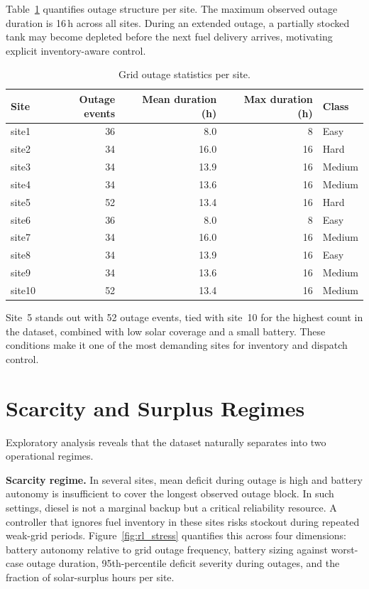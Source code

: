 Table~\ref{tab:outage_stats} quantifies outage structure per site.
The maximum observed outage duration is 16\,h across all sites.
During an extended outage, a partially stocked tank may become
depleted before the next fuel delivery arrives, motivating
explicit inventory-aware control.

\begin{table}[htb]
\centering
\small
\caption{Grid outage statistics per site.}
\label{tab:outage_stats}
\begin{tabular}{lrrrl}
\toprule
\textbf{Site} & \textbf{Outage events} & \textbf{Mean duration (h)} &
\textbf{Max duration (h)} & \textbf{Class} \\
\midrule
site1  & 36 &  8.0 &  8 & Easy   \\
site2  & 34 & 16.0 & 16 & Hard   \\
site3  & 34 & 13.9 & 16 & Medium \\
site4  & 34 & 13.6 & 16 & Medium \\
site5  & 52 & 13.4 & 16 & Hard   \\
site6  & 36 &  8.0 &  8 & Easy   \\
site7  & 34 & 16.0 & 16 & Medium \\
site8  & 34 & 13.9 & 16 & Easy   \\
site9  & 34 & 13.6 & 16 & Medium \\
site10 & 52 & 13.4 & 16 & Medium \\
\bottomrule
\end{tabular}
\end{table}

Site~5 stands out with 52 outage events, tied with site~10
for the highest count in the dataset, combined with low
solar coverage and a small battery. These conditions make
it one of the most demanding sites for inventory and
dispatch control.


\section{Scarcity and Surplus Regimes}
\label{sec:scarcity_surplus}

Exploratory analysis reveals that the dataset naturally separates into two
operational regimes.

\textbf{Scarcity regime.}
In several sites, mean deficit during outage is high and battery autonomy is
insufficient to cover the longest observed outage block.  In such settings,
diesel is not a marginal backup but a critical reliability resource.  A
controller that ignores fuel inventory in these sites risks stockout during
repeated weak-grid periods.  Figure~\ref{fig:rl_stress} quantifies this
across four dimensions: battery autonomy relative to grid outage frequency,
battery sizing against worst-case outage duration, 95th-percentile deficit
severity during outages, and the fraction of solar-surplus hours per site.

